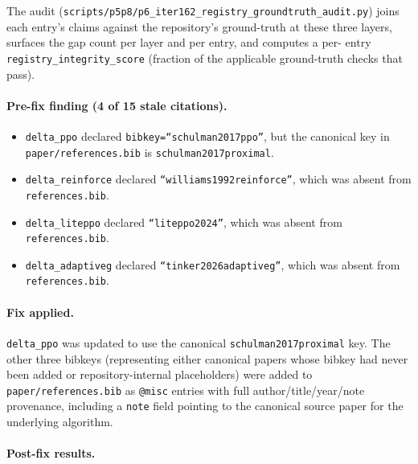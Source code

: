 The audit (\texttt{scripts/p5p8/p6\_iter162\_registry\_groundtruth\_audit.py})
joins each entry's claims against the repository's ground-truth at these three
layers, surfaces the gap count per layer and per entry, and computes a per-
entry \texttt{registry\_integrity\_score} (fraction of the applicable
ground-truth checks that pass).

\paragraph{Pre-fix finding (4 of 15 stale citations).}
\begin{itemize}
\item \texttt{delta\_ppo} declared \texttt{bibkey=``schulman2017ppo''}, but
the canonical key in \texttt{paper/references.bib} is
\texttt{schulman2017proximal}.
\item \texttt{delta\_reinforce} declared \texttt{``williams1992reinforce''},
which was absent from \texttt{references.bib}.
\item \texttt{delta\_liteppo} declared \texttt{``liteppo2024''}, which was
absent from \texttt{references.bib}.
\item \texttt{delta\_adaptiveg} declared \texttt{``tinker2026adaptiveg''},
which was absent from \texttt{references.bib}.
\end{itemize}

\paragraph{Fix applied.} \texttt{delta\_ppo} was updated to use the
canonical \texttt{schulman2017proximal} key. The other three bibkeys
(representing either canonical papers whose bibkey had never been added or
repository-internal placeholders) were added to \texttt{paper/references.bib}
as \texttt{@misc} entries with full author/title/year/note provenance,
including a \texttt{note} field pointing to the canonical source paper for
the underlying algorithm.

\paragraph{Post-fix results.}

